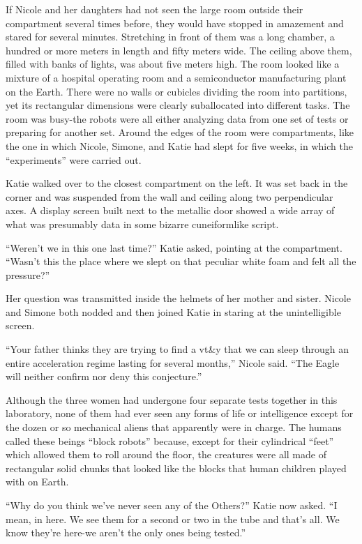 \documentclass[]{article}
\begin{document}
{If Nicole and her daughters had not seen the large room outside their compartment several times before, they would have stopped in amazement and stared for several minutes.  Stretching in front of them was a long chamber, a hundred or more meters in length and fifty meters wide.  The ceiling above them, filled with banks of lights, was about five meters high.  The room looked like a mixture of a hospital operating room and a semiconductor manufacturing plant on the Earth.  There were no walls or cubicles dividing the room into partitions, yet its rectangular dimensions were clearly suballocated into different tasks.  The room was busy-the robots were all either analyzing data from one set of tests or preparing for another set.  Around the edges of the room were compartments, like the one in which Nicole, Simone, and Katie had slept for five weeks, in which the “experiments” were carried out.

Katie walked over to the closest compartment on the left.  It was set back in the corner and was suspended from the wall and ceiling along two perpendicular axes.  A display screen built next to the metallic door showed a wide array of what was presumably data in some bizarre cuneiformlike script.

“Weren’t we in this one last time?” Katie asked, pointing at the compartment.  “Wasn’t this the place where we slept on that peculiar white foam and felt all the pressure?”

Her question was transmitted inside the helmets of her mother and sister.  Nicole and Simone both nodded and then joined Katie in staring at the unintelligible screen.

“Your father thinks they are trying to find a vt\&y that we can sleep through an entire acceleration regime lasting for several months,” Nicole said.  “The Eagle will neither confirm nor deny this conjecture.”

Although the three women had undergone four separate tests together in this laboratory, none of them had ever seen any forms of life or intelligence except for the dozen or so mechanical aliens that apparently were in charge.  The humans called these beings “block robots” because, except for their cylindrical “feet” which allowed them to roll around the floor, the creatures were all made of rectangular solid chunks that looked like the blocks that human children played with on Earth.

“Why do you think we’ve never seen any of the Others?” Katie now asked.  “I mean, in here.  We see them for a second or two in the tube and that’s all.  We know they’re here-we aren’t the only ones being tested.”

}
\end{document}
